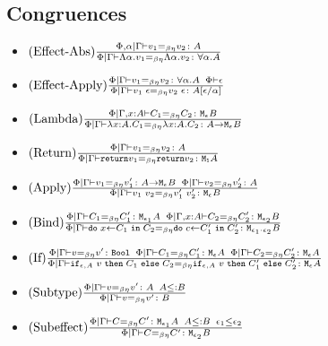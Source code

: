 {\subsection{Congruences}
\begin{itemize}
    \item $\treerule{Effect-Abs}{\eberelation{\P, \a}{\G}{v_1}{v_2}{A}}{\gpeberelation{\elam{\a}{v_1}}{\elam{\a}{v_2}}{\all{\a}{A}}}$
    \item $\treerule{Effect-Apply}{\gpeberelation{v_1}{v_2}{\all{\a}{A}}\s\s\wellformed{\P}{\e}}{\gpeberelation{\eapp{v_1}{\e}}{\eapp{v_2}{\e}}{A\ssub{\a}{\e}}}$
    \item $\treerule{Lambda}{\eberelation{\P}{\gax}{C_1}{C_2}{\meb}}{\gpeberelation{\lam{x}{A}{C_1}}{\lam{x}{A}{C_2}}{\aeb}}$
    
    \item $\treerule{Return}{\gpeberelation{v_1}{v_2}{A}}{\gpeberelation{\return{v_1}}{\return{v_2}}{\moa}}$
    
    \item $\treerule{Apply}{\gpeberelation{v_1}{v_1'}{\aeb}\s\s\gpeberelation{v_2}{v_2'}{A}}{\gpeberelation{\apply{v_1}{v_2}}{\apply{v_1'}{v_2'}}{\meb}}$
    
    \item $\treerule{Bind}{\gpeberelation{C_1}{C_1'}{\M{\e_1}{A}} \s\s \eberelation{\P}{\gax}{C_2}{C_2'}{\M{\e_2}{B}}}{\gpeberelation{\doin{x}{C_1}{C_2}}{\doin{c}{C_1'}{C_2'}}{\M{\e_1 \dot \e_2}{B}}}$
    
    \item $\treerule{If}{\gpeberelation{v}{v'}{\B} \s\s \gpeberelation{C_1}{C_1'}{\mea}\s\s\gpeberelation{C_2}{C_2'}{\mea}}{\gpeberelation{\ifthenelse{\e}{A}{v}{C_1}{C_2}}{\ifthenelse{\e}{A}{v}{C_1'}{C_2'}}{\mea}}$
    \item $\treerule{Subtype}{\gpeberelation{v}{v'}{A} \s\s A \subtype B}{\gpeberelation{v}{v'}{B}}$
    \item $\treerule{Subeffect}{\gpeberelation{C}{C'}{\M{\e_1}{A}}\s\s A \subtype B \s\s \e_1 \subeffect \e_2}{\gpeberelation{C}{C'}{\M{\e_2}{B}}}$
\end{itemize}
}

\ifdefined\NoDocument
\else
\documentclass{report}


    \LanguageDefinition

\fi
